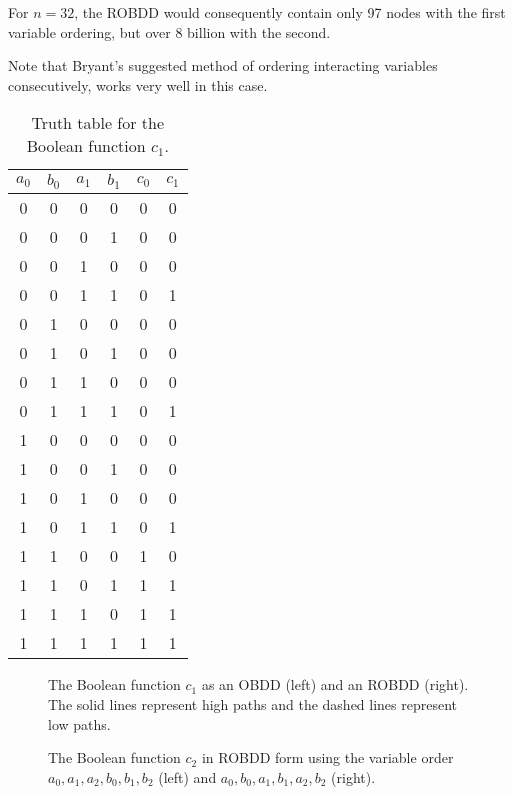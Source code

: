 \documentclass[a4paper,11pt]{kth-mag}
\begin{document}
For $n = 32$, the ROBDD would consequently contain only 97 nodes with the first variable ordering, but over 8 billion with the second.

Note that Bryant's suggested method of ordering interacting variables consecutively, works very well in this case.

\begin{table}
\centering
\begin{tabular}{cccc|cc}
$a_0$ & $b_0$ & $a_1$ & $b_1$ & $c_0$ & $c_1$ \\
\hline
0     & 0     & 0     & 0     & 0     & 0 \\
0     & 0     & 0     & 1     & 0     & 0 \\
0     & 0     & 1     & 0     & 0     & 0 \\
0     & 0     & 1     & 1     & 0     & 1 \\
0     & 1     & 0     & 0     & 0     & 0 \\
0     & 1     & 0     & 1     & 0     & 0 \\
0     & 1     & 1     & 0     & 0     & 0 \\
0     & 1     & 1     & 1     & 0     & 1 \\
1     & 0     & 0     & 0     & 0     & 0 \\
1     & 0     & 0     & 1     & 0     & 0 \\
1     & 0     & 1     & 0     & 0     & 0 \\
1     & 0     & 1     & 1     & 0     & 1 \\
1     & 1     & 0     & 0     & 1     & 0 \\
1     & 1     & 0     & 1     & 1     & 1 \\
1     & 1     & 1     & 0     & 1     & 1 \\
1     & 1     & 1     & 1     & 1     & 1 \\
\end{tabular}
\caption{Truth table for the Boolean function $c_1$.}
\label{tab:tt_c1}
\end{table}

\begin{figure}[p]
\centering

\caption{The Boolean function $c_1$ as an OBDD (left) and an ROBDD (right). The solid lines represent high paths and the dashed lines represent low paths.}
\label{fig:bdd_c1}
\end{figure}

\begin{figure}[p]
\centering

\caption{The Boolean function $c_2$ in ROBDD form using the variable order $a_0,a_1,a_2,b_0,b_1,b_2$ (left) and $a_0,b_0,a_1,b_1,a_2,b_2$ (right).}
\label{fig:bdd_c2_bad}
\end{figure}
\end{document}
